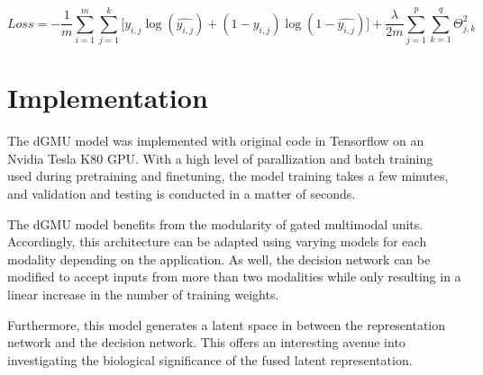 \begin{equation}
    Loss = - \frac{1}{m}\sum_{i = 1}^{m}\sum_{j = 1}^{k} \lbrack y_{i,j} \log(\hat{y_{i,j}}) + (1 - y_{i,j})\log(1 - \hat{y_{i,j}}) \rbrack + \frac{\lambda}{2m} \sum_{j = 1}^{p}\sum_{k = 1}^{q}\Theta^{2}_{j,k}
\end{equation}

\section{Implementation}

The dGMU model was implemented with original code in Tensorflow on an Nvidia Tesla K80 GPU. With a high level of parallization and batch training used during pretraining and finetuning, the model training takes a few minutes, and validation and testing is conducted in a matter of seconds.

The dGMU model benefits from the modularity of gated multimodal units. Accordingly, this architecture can be adapted using varying models for each modality depending on the application. As well, the decision network can be modified to accept inputs from more than two modalities while only resulting in a linear increase in the number of training weights.

Furthermore, this model generates a latent space in between the representation network and the decision network. This offers an interesting avenue into investigating the biological significance of the fused latent representation. 